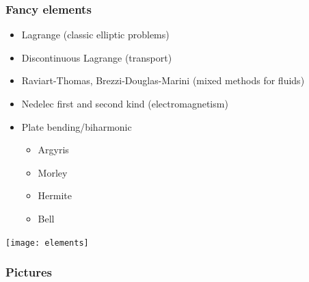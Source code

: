 \documentclass[presentation, 10pt]{beamer}
\begin{document}
\begin{frame}
  \frametitle{Fancy elements}
  \begin{itemize}
  \item Lagrange (classic elliptic problems)
  \item Discontinuous Lagrange (transport)
  \item Raviart-Thomas, Brezzi-Douglas-Marini (mixed methods for fluids)
  \item Nedelec first and second kind (electromagnetism)
  \item Plate bending/biharmonic
    \begin{itemize}
    \item Argyris
    \item Morley
    \item Hermite
    \item Bell
    \end{itemize}
  \end{itemize}
  \begin{center}
    \texttt{[image: elements]}
  \end{center}
\end{frame}

\begin{frame}
  \frametitle{Pictures}
  \begin{center}
  \end{center}
\end{frame}
\end{document}
